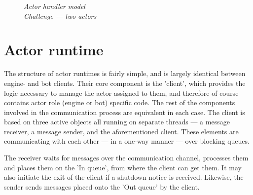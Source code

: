 \begin{figure}[h]
			\caption*{\emph{Actor handler model} \\ \emph{Challenge --- two actors}}
		\end{figure}		
		
	\section{Actor runtime}

	The structure of actor runtimes is fairly simple, and is largely identical between engine- and bot clients. Their core component is the 'client', which provides the logic necessary to manage the actor assigned to them, and therefore of course contains actor role (engine or bot) specific code. The rest of the components involved in the communication process are equivalent in each case. The client is based on three active objects all running on separate threads --- a message receiver, a message sender, and the aforementioned client. These elements are communicating with each other --- in a one-way manner --- over blocking queues.
	
	The receiver waits for messages over the communication channel, processes them and places them on the 'In queue', from where the client can get them. It may also initiate the exit of the client if a shutdown notice is received. Likewise, the sender sends messages placed onto the 'Out queue' by the client.
		
